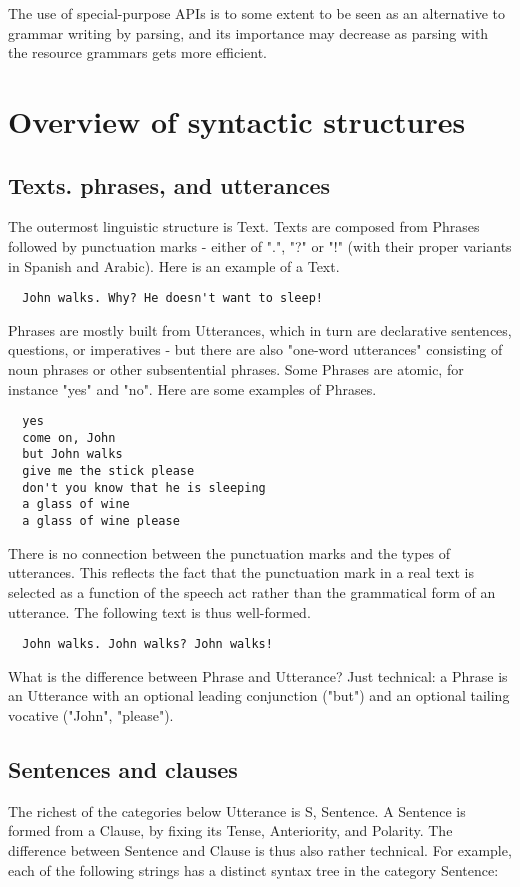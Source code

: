 \documentclass[11pt,a4paper]{article}
\begin{document}
The use of special-purpose APIs is to some extent to be seen as an alternative
to grammar writing by parsing, and its importance may decrease as parsing
with the resource grammars gets more efficient.

\section{Overview of syntactic structures}
\subsection{Texts. phrases, and utterances}
The outermost linguistic structure is Text. Texts are composed
from Phrases followed by punctuation marks - either of ".", "?" or
"!" (with their proper variants in Spanish and Arabic). Here is an 
example of a Text.

\begin{verbatim}
  John walks. Why? He doesn't want to sleep!
\end{verbatim}
Phrases are mostly built from Utterances, which in turn are
declarative sentences, questions, or imperatives - but there
are also "one-word utterances" consisting of noun phrases
or other subsentential phrases. Some Phrases are atomic,
for instance "yes" and "no". Here are some examples of Phrases.

\begin{verbatim}
  yes
  come on, John
  but John walks
  give me the stick please
  don't you know that he is sleeping
  a glass of wine
  a glass of wine please
\end{verbatim}
There is no connection between the punctuation marks and the
types of utterances. This reflects the fact that the punctuation
mark in a real text is selected as a function of the speech act
rather than the grammatical form of an utterance. The following
text is thus well-formed.

\begin{verbatim}
  John walks. John walks? John walks!
\end{verbatim}
What is the difference between Phrase and Utterance? Just technical:
a Phrase is an Utterance with an optional leading conjunction ("but")
and an optional tailing vocative ("John", "please").

\subsection{Sentences and clauses}
The richest of the categories below Utterance is S, Sentence. A Sentence
is formed from a Clause, by fixing its Tense, Anteriority, and Polarity.
The difference between Sentence and Clause is thus also rather technical.
For example, each of the following strings has a distinct syntax tree
in the category Sentence:
\end{document}
